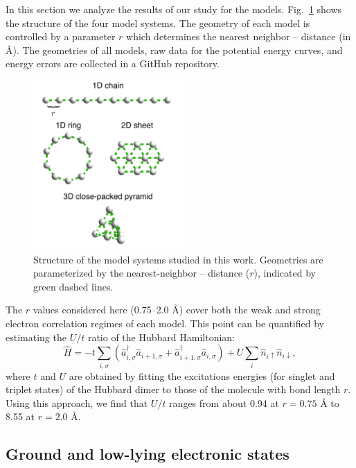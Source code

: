 \documentclass[aip,jcp,amsmath,amssymb, preprint]{revtex4-1}
\begin{document}
In this section we analyze the results of our study for the  models. 
Fig.~\ref{fig:systems} shows the structure of the four  model systems. 
The geometry of each model is controlled by a parameter $r$ which determines the nearest neighbor --  distance (in {\AA}).
The geometries of all models, raw data for the potential energy curves, and energy errors are collected in a GitHub repository.\cite{HstudyRepo2020}

\begin{figure}[bt!]
\centering
\includegraphics[width=2.25in]{figure_1.png}
\caption{Structure of the  model systems studied in this work. Geometries are parameterized by the nearest-neighbor -- distance ($r$), indicated by green dashed lines.}
\label{fig:systems}
\end{figure}

The $r$ values considered here (0.75--2.0 {\AA}) cover both the weak and strong electron correlation regimes of each model.
This point can be quantified by estimating the $U/t$ ratio of the Hubbard Hamiltonian:
\begin{equation}
\hat {H} =-t\sum _{i,\sigma }\left({\hat {a}}_{i,\sigma }^{\dagger }{\hat {a}}_{i+1,\sigma }+{\hat {a}}_{i+1,\sigma }^{\dagger }{\hat {a}}_{i,\sigma }\right)+U\sum _{i}{\hat {n}}_{i\uparrow }{\hat {n}}_{i\downarrow },
\end{equation}
where $t$ and $U$ are obtained by fitting the excitations energies (for singlet and triplet states) of the Hubbard dimer to those of the  molecule with bond length $r$.
Using this approach, we find that $U/t$ ranges from about 0.94 at $r = 0.75$ {\AA} to 8.55 at $r = 2.0$ {\AA}.

\subsection{\label{sec:low_lying_states}Ground and low-lying electronic states}
\end{document}

